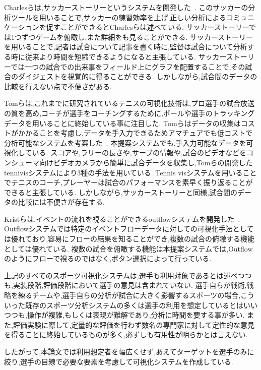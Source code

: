 \documentclass[sotsuron]{kuee}
\begin{document}
	Charlesらは,サッカーストーリーというシステムを開発した~\cite{SoccerStory}.  
	このサッカーの分析ツールを用いることで,サッカーの練習効率を上げ,正しい分析によるコミュニケーションを促すことができるとCharlesらは述べている.  
	サッカーストーリーでは1つずつゲームを俯瞰し,また詳細をも見ることができる.  
	サッカーストーリーを用いることで,記者は試合について記事を書く時に,監督は試合について分析する時に従来より時間を短縮できるようになると主張している.  
	サッカーストーリーでは一つの試合での出来事をフィールド上にグラフを配置することで,その試合のダイジェストを視覚的に得ることができる.  
	しかしながら,試合間のデータの比較を行えない点で不便さがある.  
	
	Tomらは,これまでに研究されているテニスの可視化技術は,プロ選手の試合放送の質を高め,コーチが選手をコーチングするために,ボールや選手のトラッキングデータを用いることに終始している事に注目した.  
	Tomらはデータの収集はコストがかかることを考慮し,データを手入力できるためアマチュアでも低コストで分析可能なシステムを考案した~\cite{TenniVis}.  
	本提案システムでも,手入力可能なデータを可視化している.  
	スコアや,ラリーの長さや,サーブの情報や,試合のビデオなどをコンシューマ向けビデオカメラから簡単に試合データを収集し,Tomらの開発したtennivisシステムにより3種の手法を用いている.  
	Tennis visシステムを用いることでテニスのコーチ,プレーヤーは試合のパフォーマンスを素早く振り返ることができると主張している.  
	しかしながら,サッカーストーリーと同様,試合間のデータの比較には不便さが存在する.  
	
	Kristらは,イベントの流れを視ることができるoutflowシステムを開発した~\cite{Outflow}.  
	Outflowシステムでは特定のイベントフローデータに対しての可視化手法としては優れており,容易にフローの結果を知ることができ,複数の試合の俯瞰する機能としては優れている.  
	複数の試合を俯瞰する機能は本提案システムでは,Outflowのようにフローで視るのではなく,ボタン選択によって行っている.  	
	
	上記のすべてのスポーツ可視化システムは,選手も利用対象であるとは述べつつも,実装段階,評価段階において選手の意見は含まれていない.  
	選手自らが戦術,戦略を練るチームや,選手自らの分析が試合に大きく影響するスポーツの場合,こういった既存のスポーツ分析システムの多くは選手の利用を想定しているとはいいつつも,操作が複雑,もしくは表現が難解であり,分析に時間を要する事が多い.  
	また,評価実験に際して,定量的な評価を行わず数名の専門家に対して定性的な意見を得ることに終始しているものが多く,必ずしも有用性が明らかとは言えない.  
	
	したがって,本論文では利用想定者を幅広くせず,あえてターゲットを選手のみに絞り,選手の目線で必要な要素を考慮して可視化システムを作成している.  
	
\end{document}

